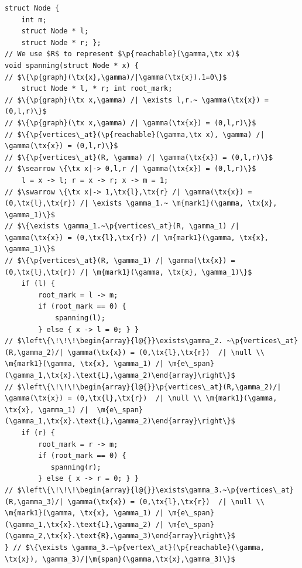 \documentclass[acmsmall,screen]{acmart}  %
\newcommand{\tx}[1]{\text{#1}}
\newcommand{\p}[1]{\ensuremath{\mathsf{#1}}} \newcommand{\m}[1]{\ensuremath{\mathit{#1}}} \newcommand{\ma}[1]{\ensuremath{\mathcal{#1}}} \let\ramify\lightning
\begin{document}
\begin{lstlisting}
struct Node {
    int m;
    struct Node * l;
    struct Node * r; };
// We use $R$ to represent $\p{reachable}(\gamma,\tx x)$
void spanning(struct Node * x) { 
// $\{\p{graph}(\tx{x},\gamma)/|\gamma(\tx{x}).1=0\}$ 
    struct Node * l, * r; int root_mark;
// $\{\p{graph}(\tx x,\gamma) /| \exists l,r.~ \gamma(\tx{x}) = (0,l,r)\}$
// $\{\p{graph}(\tx x,\gamma) /| \gamma(\tx{x}) = (0,l,r)\}$
// $\{\p{vertices\_at}(\p{reachable}(\gamma,\tx x), \gamma) /| \gamma(\tx{x}) = (0,l,r)\}$
// $\{\p{vertices\_at}(R, \gamma) /| \gamma(\tx{x}) = (0,l,r)\}$
// $\searrow \{\tx x|-> 0,l,r /| \gamma(\tx{x}) = (0,l,r)\}$
    l = x -> l; r = x -> r; x -> m = 1;
// $\swarrow \{\tx x|-> 1,\tx{l},\tx{r} /| \gamma(\tx{x}) = (0,\tx{l},\tx{r}) /| \exists \gamma_1.~ \m{mark1}(\gamma, \tx{x}, \gamma_1)\}$
// $\{\exists \gamma_1.~\p{vertices\_at}(R, \gamma_1) /| \gamma(\tx{x}) = (0,\tx{l},\tx{r}) /| \m{mark1}(\gamma, \tx{x}, \gamma_1)\}$
// $\{\p{vertices\_at}(R, \gamma_1) /| \gamma(\tx{x}) = (0,\tx{l},\tx{r}) /| \m{mark1}(\gamma, \tx{x}, \gamma_1)\}$
    if (l) {
        root_mark = l -> m;
        if (root_mark == 0) {
            spanning(l);
        } else { x -> l = 0; } }
// $\left\{\!\!\!\begin{array}{l@{}}\exists\gamma_2. ~\p{vertices\_at}(R,\gamma_2)/| \gamma(\tx{x}) = (0,\tx{l},\tx{r})  /| \null \\ \m{mark1}(\gamma, \tx{x}, \gamma_1) /| \m{e\_span}(\gamma_1,\tx{x}.\text{L},\gamma_2)\end{array}\right\}$
// $\left\{\!\!\!\begin{array}{l@{}}\p{vertices\_at}(R,\gamma_2)/| \gamma(\tx{x}) = (0,\tx{l},\tx{r})  /| \null \\ \m{mark1}(\gamma, \tx{x}, \gamma_1) /|  \m{e\_span}(\gamma_1,\tx{x}.\text{L},\gamma_2)\end{array}\right\}$
    if (r) {
        root_mark = r -> m;
        if (root_mark == 0) {
           spanning(r);
        } else { x -> r = 0; } }
// $\left\{\!\!\!\begin{array}{l@{}}\exists\gamma_3.~\p{vertices\_at}(R,\gamma_3)/| \gamma(\tx{x}) = (0,\tx{l},\tx{r})  /| \null \\ \m{mark1}(\gamma, \tx{x}, \gamma_1) /| \m{e\_span}(\gamma_1,\tx{x}.\text{L},\gamma_2) /| \m{e\_span}(\gamma_2,\tx{x}.\text{R},\gamma_3)\end{array}\right\}$
} // $\{\exists \gamma_3.~\p{vertex\_at}(\p{reachable}(\gamma, \tx{x}), \gamma_3)/|\m{span}(\gamma,\tx{x},\gamma_3)\}$
  \end{lstlisting}
\end{document}
